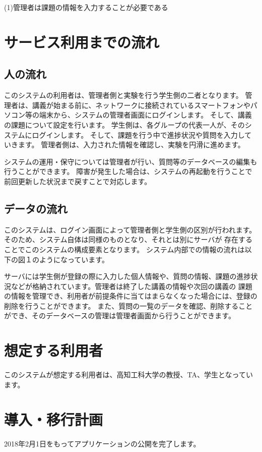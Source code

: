 \documentclass[a4j,titlepage]{ujarticle}
\begin{document}
(1)管理者は課題の情報を入力することが必要である

\section{サービス利用までの流れ}
\subsection{人の流れ}
このシステムの利用者は、管理者側と実験を行う学生側の二者となります。
管理者は、講義が始まる前に、ネットワークに接続されているスマートフォンやパソコン等の端末から、システムの管理者画面にログインします。
そして、講義の課題について設定を行います。
学生側は、各グループの代表一人が、そのシステムにログインします。
そして、課題を行う中で進捗状況や質問を入力していきます。
管理者側は、入力された情報を確認し、実験を円滑に進めます。

システムの運用・保守については管理者が行い、質問等のデータベースの編集も行うことができます。
障害が発生した場合は、システムの再起動を行うことで前回更新した状況まで戻すことで対応します。 %


\subsection{データの流れ}
このシステムは、ログイン画面によって管理者側と学生側の区別が行われます。そのため、システム自体は同様のものとなり、それとは別にサーバが %
存在することでこのシステムの構成要素となります。
システム内部での情報の流れは以下の図１のようになっています。 %

サーバには学生側が登録の際に入力した個人情報や、質問の情報、課題の進捗状況などが格納されています。管理者は終了した講義の情報や次回の講義の
課題の情報を管理でき、利用者が前提条件に当てはまらなくなった場合には、登録の削除を行うことができます。
また、質問の一覧のデータを確認、削除することができ、そのデータベースの管理は管理者画面から行うことができます。

\section{想定する利用者}
このシステムが想定する利用者は、高知工科大学の教授、TA、学生となっています。 %

\section{導入・移行計画}
2018年2月1日をもってアプリケーションの公開を完了します。
\end{document}

